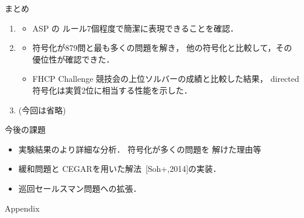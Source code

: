 \documentclass[dvipdfmx]{beamer}
\begin{document}
\begin{frame}{まとめ}

\begin{enumerate}
\item {}
  \begin{itemize}
  \item ASP の \alert{ルール7個}程度で簡潔に表現できることを確認．
  \end{itemize}
\item {}
  \begin{itemize}
  \item {} 符号化が879問と最も多くの問題を解き，
    他の符号化と比較して，その優位性が確認できた．
  \item FHCP Challenge 競技会の上位ソルバーの成績と比較した結果，
    directed 符号化は\alert{実質2位}に相当する性能を示した．
  \end{itemize}
\item {} (今回は省略)
\end{enumerate}

\begin{block}{今後の課題}
  \begin{itemize}
  \item 実験結果のより詳細な分析． 符号化が多くの問題を
    解けた理由等
  \item 緩和問題と CEGARを用いた解法~{\scriptsize[Soh+,2014]}の実装．
  \item 巡回セールスマン問題への拡張．
  \end{itemize}
\end{block}
\end{frame}
\appendix
\begin{frame}{}
  \begin{center}\Huge
    Appendix
  \end{center}
\end{frame}
\end{document}
